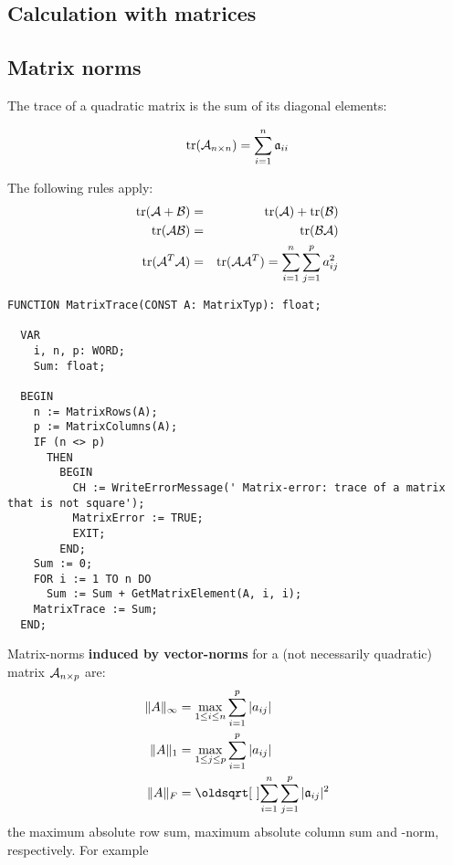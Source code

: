 \begin{refsection}
\section{Calculation with matrices}

\subsection{Matrix norms}

The trace of a quadratic matrix is the sum of its diagonal elements:

\begin{equation}
  \mathrm{tr}(\mathcal{A}_{n \times n}) = \sum_{i=1}^n{\mathfrak{a}_{ii}}
\end{equation}

The following rules apply:
\begin{eqnarray}
  \operatorname{tr}(\mathcal{A}+\mathcal{B}) &=& \operatorname{tr}(\mathcal{A}) + \operatorname{tr}(\mathcal{B}) \\
  \operatorname{tr}(\mathcal{AB}) &=& \operatorname{tr}(\mathcal{BA}) \\
  \operatorname{tr}(\mathcal{A}^T\mathcal{A}) &=& \operatorname{tr}(\mathcal{A}\mathcal{A}^T) = \sum_{i=1}^{n}{\sum_{j=1}^{p}{a_{ij}^2}}
\end{eqnarray}

\begin{lstlisting}[caption=Trace of a matrix]
  FUNCTION MatrixTrace(CONST A: MatrixTyp): float;

  VAR
    i, n, p: WORD;
    Sum: float;

  BEGIN
    n := MatrixRows(A);
    p := MatrixColumns(A);
    IF (n <> p)
      THEN
        BEGIN
          CH := WriteErrorMessage(' Matrix-error: trace of a matrix that is not square');
          MatrixError := TRUE;
          EXIT;
        END;
    Sum := 0;
    FOR i := 1 TO n DO
      Sum := Sum + GetMatrixElement(A, i, i);
    MatrixTrace := Sum;
  END;
\end{lstlisting}

Matrix-norms \textbf{induced by vector-norms} for a (not necessarily quadratic) matrix \(\mathcal{A}_{n \times p} \) are:
\begin{align}
   \|A\|_\infty &= \max_{1\leq i\leq n}\sum_{i=1}^p{|a_{ij}|} \\
   \|A\|_1 &= \max_{1\leq j\leq p}\sum_{i=1}^p{|a_{ij}|} \\
   \|A\|_F &= \sqrt{\sum_{i=1}^n{\sum_{j=1}^p{|\AbsVec{a}_{ij}|^2}}}
\end{align}
the maximum absolute row sum, maximum absolute column sum and -norm, respectively. For example


\end{refsection}
